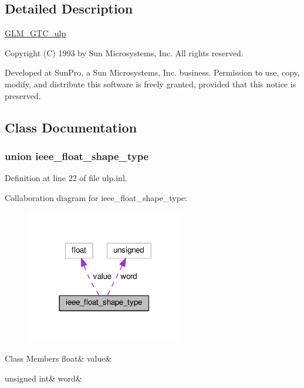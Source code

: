 \subsection{Detailed Description}
\hyperlink{group__gtc__ulp}{G\+L\+M\+\_\+\+G\+T\+C\+\_\+ulp}

Copyright (C) 1993 by Sun Microsystems, Inc. All rights reserved.

Developed at Sun\+Pro, a Sun Microsystems, Inc. business. Permission to use, copy, modify, and distribute this software is freely granted, provided that this notice is preserved. 

\subsection{Class Documentation}
\label{unionieee__float__shape__type}
\subsubsection{union ieee\+\_\+float\+\_\+shape\+\_\+type}


Definition at line 22 of file ulp.\+inl.



Collaboration diagram for ieee\+\_\+float\+\_\+shape\+\_\+type\+:
\nopagebreak
\begin{figure}[H]
\begin{center}
\leavevmode
\includegraphics[width=197pt]{d5/d77/unionieee__float__shape__type__coll__graph}
\end{center}
\end{figure}
\begin{DoxyFields}{Class Members}
\mbox{\label{ulp_8inl_aa0c47451f1b974421cbb9e2833ddb68e}} 
float&
value&
\\
\hline

\mbox{\label{ulp_8inl_a49230c21acd672d044f38b1abcbd6071}} 
unsigned int&
word&
\\
\hline

\end{DoxyFields}
\label{unionieee__double__shape__type}
